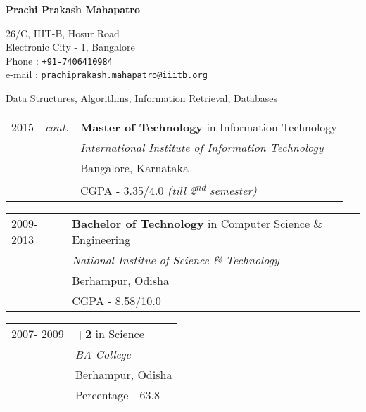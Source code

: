 \documentclass[10pt]{article}
\newcommand{\shadethis}[1]{ \begin{snugshade}#1\end{snugshade}}
\begin{document}
	
	
	\begin{center}
		\textbf{\Large Prachi Prakash Mahapatro}
		\begin{center}
			26/C, IIIT-B, Hosur Road \\
			Electronic City - 1, Bangalore \\
			Phone : \texttt{+91-7406410984}\\
			e-mail : \href{prachiprakash.mahapatro@iiitb.org}{\texttt{prachiprakash.mahapatro@iiitb.org}}\\
		\end{center} 

	\end{center}
	

	\begin{description}[style=nextline]
		
		\shadethis{\item{}}
		
			Data Structures,  Algorithms, Information Retrieval, Databases
		
		\shadethis{\item{}}
			\begin{tabular}{p{2cm}|p{10cm}}
			{2015 - \emph{cont.}} & \textbf{Master of Technology} in Information Technology\\
			  		& \emph{International Institute of Information Technology}\\
					& Bangalore, Karnataka \\
					& {CGPA - 3.35/4.0 \emph{(till 2\textsuperscript{nd} semester)}} 
					
			\end{tabular}
			
			\begin{tabular}{p{2cm}|p{10cm}}

			{2009- 2013} 	& \textbf{Bachelor of Technology} in Computer Science \& Engineering \\
			 	& \emph{National Institue of Science \& Technology} \\
				& Berhampur, Odisha\\
				& {CGPA - 8.58/10.0}		
			\end{tabular}
		
		\begin{tabular}{p{2cm}|p{10cm}}

			{2007- 2009} 	& \textbf{+2} in Science \\
			 	& \emph{BA College} \\
				& Berhampur, Odisha\\
				& {Percentage - 63.8}		
			\end{tabular}
			

\end{description}
\end{document}
